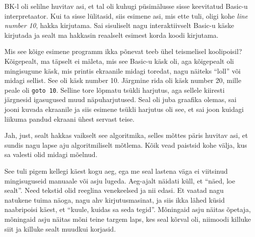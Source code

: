 BK-l oli selilne huvitav asi, et tal oli kuhugi püsimälusse sisse keevitatud 
Basic-u interpretaator. Kui ta sisse lülitasid, siis 
esimene asi, mis ette tuli, oligi kohe \emph{line number 10}, hakka kirjutama. 
Sai sisuliselt nagu interaktiivselt Basic-u käske kirjutada ja sealt ma 
hakkasin reaalselt esimest korda koodi kirjutama. 


Mis see kõige esimene programm ikka põnevat teeb ühel teismelisel koolipoisil? 
Kõigepealt, ma täpselt ei mäleta, mis see Basic-u käsk oli, aga kõigepealt oli 
mingisugune käsk, mis printis ekraanile midagi toredat, nagu näiteks 
\enquote{loll} või midagi sellist. See oli käsk number 10. Järgmine rida 
oli käsk number 20, mille peale oli  \verb|goto 10|. Selline tore lõpmatu 
tsükli harjutus, aga sellele kiiresti järgnesid igasugused muud näpuharjutused. 
Seal oli juba graafika olemas, sai jooni kuvada ekraanile ja siis esimene 
tsükli harjutus oli see, et sai joon kuidagi liikuma pandud ekraani ühest 
servast teise. 


Jah, just, sealt hakkas vaikselt see algoritmika, selles mõttes päris huvitav 
asi, et sundis nagu lapse aju algoritmiliselt mõtlema. Kõik vead paistsid kohe 
välja, kus sa valesti olid midagi mõelnud. 


See tuli pigem kellegi käest kogu aeg, ega me seal lastena väga ei viitsinud 
mingisuguseid manuaale või asju lugeda. Aeg-ajalt näidati küll, et 
\enquote{näed, loe sealt}. Need tekstid olid reeglina  venekeelsed ja nii 
edasi. Et vaatad nagu natukene tuima näoga, nagu ahv kirjutusmasinat, ja siis 
ikka lähed küsid naabripoisi käest, et \enquote{kuule, kuidas sa seda tegid}. 
Mõningaid asju näitas õpetaja, mõningaid asju näitas mõni teine targem laps, 
kes seal kõrval oli, niimoodi killuke siit ja killuke sealt  muudkui korjasid. 


